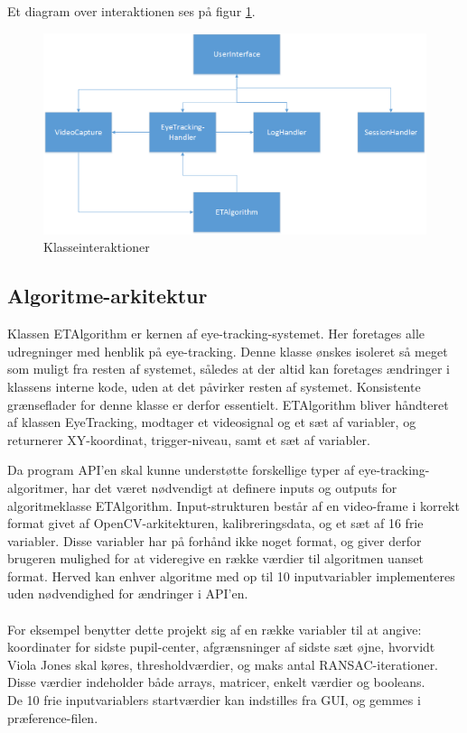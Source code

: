 \documentclass[rapport.tex]{subfiles}
\begin{document}
		Et diagram over interaktionen ses på figur \ref{fig:klasseinteraktion}.
		
		\begin{figure}
		\centering
		\includegraphics[width=0.9\linewidth]{klasseinteraktion}
		\caption{Klasseinteraktioner}
		\label{fig:klasseinteraktion}
		\end{figure}
	\subsection{Algoritme-arkitektur}
	Klassen ETAlgorithm er kernen af eye-tracking-systemet. Her foretages alle udregninger med henblik på eye-tracking. Denne klasse ønskes isoleret så meget som muligt fra resten af systemet, således at der altid kan foretages ændringer i klassens interne kode, uden at det påvirker resten af systemet. Konsistente grænseflader for denne klasse er derfor essentielt. 
	ETAlgorithm bliver håndteret af klassen EyeTracking, modtager et videosignal og et sæt af variabler, og returnerer XY-koordinat, trigger-niveau, samt et sæt af variabler. 
	
	Da program API'en skal kunne understøtte forskellige typer af eye-tracking-algoritmer, har det været nødvendigt at definere inputs og outputs for algoritmeklasse ETAlgorithm. Input-strukturen består af en video-frame i korrekt format givet af OpenCV-arkitekturen, kalibreringsdata, og et sæt af 16 frie variabler. Disse variabler har på forhånd ikke noget format, og giver derfor brugeren mulighed for at videregive en række værdier til algoritmen uanset format. Herved kan enhver algoritme med op til 10 inputvariabler implementeres uden nødvendighed for ændringer i API'en.\\
	\\
	 For eksempel benytter dette projekt sig af en række variabler til at angive: koordinater for sidste pupil-center, afgrænsninger af sidste sæt øjne, hvorvidt Viola Jones skal køres, thresholdværdier, og maks antal RANSAC-iterationer.  Disse værdier indeholder både arrays, matricer, enkelt værdier og  booleans.
	\\
	De 10 frie inputvariablers startværdier kan indstilles fra GUI, og gemmes i præference-filen. 
\end{document}
